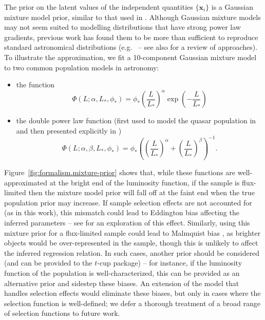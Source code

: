 \documentclass[fleqn,usenatbib]{rasti}
\newcommand{\indepvars}{\boldsymbol{x}_i}
\begin{document}
The prior on the latent values of the independent quantities $\{\indepvars\}$ is
a Gaussian mixture model prior, similar to that used in \citet{Kelly:2007}.
Although Gaussian mixture models may not seem suited to modelling distributions
that have strong power law gradients, previous work has found them to be more
than sufficient to reproduce standard astronomical distributions (e.g.\
\citealt{Blanton:2003, Kelly:2008} -- see also \citealt{Johnston:2011} for a
review of approaches). To illustrate the approximation, we fit a 10-component
Gaussian mixture model to two common population models in astronomy:
\begin{itemize}
    \item the \citet{Schechter:1976} function
    \begin{equation}
        \Phi(L; \alpha, L_*, \phi_*)
          = \phi_* \left(\frac{L}{L_*}\right)^\alpha
            \exp \left(-\frac{L}{L_*}\right)
    \end{equation}
    \item the double power law function (first used to model the quasar
    population in \citealt{Boyle:1987} and then presented explicitly in
    \citealt{Boyle:1988})
    \begin{equation}
        \Phi(L; \alpha, \beta, L_*, \phi_*)
          = \phi_* \left(\left(\frac{L}{L_*}\right)^\alpha
             + \left(\frac{L}{L_*}\right)^\beta\right)^{-1}.
    \end{equation}
\end{itemize}
Figure~\ref{fig:formalism.mixture-prior} shows that, while these functions are
well-approximated at the bright end of the luminosity function, if the sample is
flux-limited then the mixture model prior will fall off at the faint end when
the true population prior may increase. If sample selection effects are not
accounted for (as in this work), this mismatch could lead to Eddington bias
\citep{Eddington:1913} affecting the inferred parameters -- see
\citet{Andreon:2010} for an exploration of this effect. Similarly, using this
mixture prior for a flux-limited sample could lead to Malmquist bias
\citep{Malmquist:1922}, as brighter objects would be over-represented in the
sample, though this is unlikely to affect the inferred regression relation. In
such cases, another prior should be considered (and can be provided to the
$t$-cup package) -- for instance, if the luminosity function of the population
is well-characterized, this can be provided as an alternative prior and sidestep
these biases. An extension of the model that handles selection effects
\citep[e.g.][]{Kelly:2007} would eliminate these biases, but only in cases where
the selection function is well-defined; we defer a thorough treatment of a broad
range of selection functions to future work.
\end{document}
